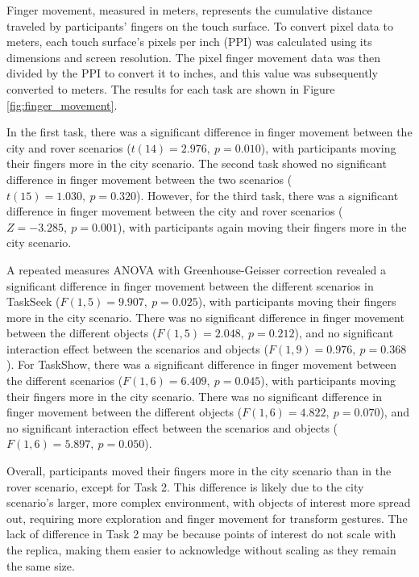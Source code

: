             Finger movement, measured in meters, represents the cumulative distance traveled by participants' fingers on the touch surface. To convert pixel data to meters, each touch surface's pixels per inch (PPI) was calculated using its dimensions and screen resolution. The pixel finger movement data was then divided by the PPI to convert it to inches, and this value was subsequently converted to meters. The results for each task are shown in Figure \ref{fig:finger_movement}. 

            In the first task, there was a significant difference in finger movement between the city and rover scenarios ($t(14) = 2.976,\ p = 0.010$), with participants moving their fingers more in the city scenario. The second task showed no significant difference in finger movement between the two scenarios ($t(15) = 1.030,\ p = 0.320$). However, for the third task, there was a significant difference in finger movement between the city and rover scenarios ($Z = -3.285,\ p = 0.001$), with participants again moving their fingers more in the city scenario.

            A repeated measures ANOVA with Greenhouse-Geisser correction revealed a significant difference in finger movement between the different scenarios in TaskSeek ($F(1, 5) = 9.907,\ p = 0.025$), with participants moving their fingers more in the city scenario. There was no significant difference in finger movement between the different objects ($F(1, 5) = 2.048,\ p = 0.212$), and no significant interaction effect between the scenarios and objects ($F(1, 9) = 0.976,\ p = 0.368$). For TaskShow, there was a significant difference in finger movement between the different scenarios ($F(1, 6) = 6.409,\ p = 0.045$), with participants moving their fingers more in the city scenario. There was no significant difference in finger movement between the different objects ($F(1, 6) = 4.822,\ p = 0.070$), and no significant interaction effect between the scenarios and objects ($F(1, 6) = 5.897,\ p = 0.050$).

            Overall, participants moved their fingers more in the city scenario than in the rover scenario, except for Task 2. This difference is likely due to the city scenario's larger, more complex environment, with objects of interest more spread out, requiring more exploration and finger movement for transform gestures. The lack of difference in Task 2 may be because points of interest do not scale with the replica, making them easier to acknowledge without scaling as they remain the same size.

